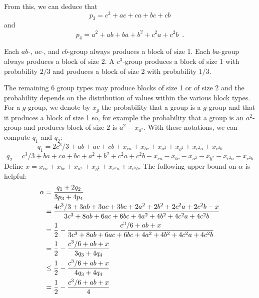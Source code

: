 \documentclass{patmorin}
\begin{document}
From this, we can deduce that
\[
    p_3 = c^3 + ac + ca + bc + cb
\]
and
\[
    p_4 = a^2 + ab + ba + b^2 + c^2a + c^2b \enspace .
\]

Each $ab$-, $ac$-, and $cb$-group always produces a block of size 1.
Each $ba$-group always produces a block of size 2.  A $c^3$-group produces
a block of size 1 with probability $2/3$ and produces a block of size
2 with probability $1/3$.

The remaining 6 group types may produce blocks of size 1 or of size
2 and the probability depends on the distribution of values within the
various block types.  For a $g$-group, we denote by $x_g$ the probability
that a group is a $g$-group and that it produces a block of size 1 so,
for example the probability that a group is an $a^2$-group and produces
block of size 2 is $a^2-x_{a^2}$.  With these notations, we can compute
$q_1$ and $q_2$:
\[
   q_1 = 2c^3/3 + ab + ac + cb + x_{ca} + x_{bc} + x_{a^2} + x_{b^2} + x_{c^2a} + x_{c^2b}
\]
\[
   q_2 = c^3/3 + ba + ca + bc + a^2 + b^2 + c^2a + c^2b
         - x_{ca} - x_{bc} - x_{a^2} - x_{b^2} - x_{c^2a} - x_{c^2b}
\]
Define $x=x_{ca} + x_{bc} + x_{a^2} + x_{b^2} + x_{c^2a} + x_{c^2b}$.
The following upper bound on $\alpha$ is helpful:
\begin{align}
  \alpha & = \frac{q_1+2q_2}{3p_3 + 4p_4} \nonumber \\
     & = \frac
        { 4c^3/3 + 3ab + 3ac + 3bc + 2a^2 + 2b^2 + 2c^2a + 2c^2b - x}
        {3c^3 + 8ab + 6ac + 6bc + 4a^2 + 4b^2 + 4c^2a + 4c^2b} \eqlabel{clear} \\
     & = \frac{1}{2}- 
        \frac{c^3/6 + ab + x}
        {3c^3 + 8ab + 6ac + 6bc + 4a^2 + 4b^2 + 4c^2a + 4c^2b} \nonumber \\
     & = \frac{1}{2}- 
        \frac{c^3/6 + ab + x}{3q_3 + 4q_4} \nonumber \\
     & \le \frac{1}{2}- 
        \frac{c^3/6 + ab + x}{4q_3 + 4q_4} \nonumber \\
     & = \frac{1}{2}- 
        \frac{c^3/6 + ab + x}{4} \nonumber
\end{align}
\end{document}
